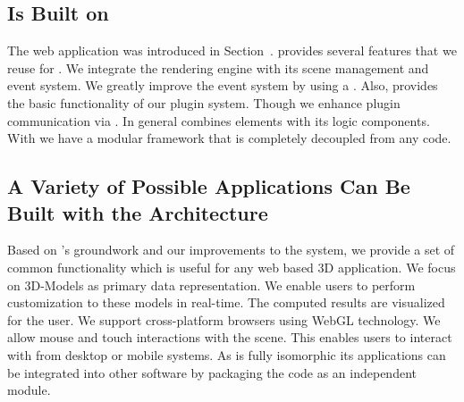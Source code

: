 \documentclass[../../ClassicThesis.tex]{subfiles}
\begin{document}


\subsection{{\convertify} Is Built on {\brickify}}
\label{sec:brickify-comparison}

The web application {\brickify} was introduced in
Section~. {\brickify} provides several
features that we reuse for {\convertify}. We integrate the
rendering engine with its scene management and event system.
We greatly improve the event system by using a
. Also, {\brickify} provides the basic
functionality of our plugin system. Though we enhance plugin
communication via . In general {\brickify}
combines {\userinterface} elements with its logic
components. With {\convertify} we have a modular framework
that is completely decoupled from any {\userinterface} code.

\subsection{A Variety of Possible Applications Can Be Built with the {\convertify} Architecture}
\label{sec:variety-of-applications}

Based on {\brickify}'s groundwork and our improvements to
the system, we provide a set of common functionality which
is useful for any web based 3D application. We focus on
3D-Models as primary data representation. We enable users to
perform customization to these models in real-time. The
computed results are visualized for the user. We support
cross-platform browsers using WebGL technology. We allow
mouse and touch interactions with the scene. This enables
users to interact with {\convertify} from desktop or mobile
systems. As {\convertify} is fully isomorphic its
applications can be integrated into other software by
packaging the code as an independent {\nodejs} module.
\end{document}
